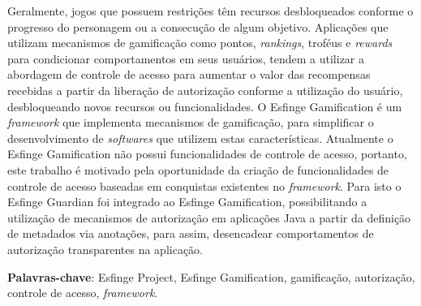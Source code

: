\setlength{\absparsep}{18pt} %
\begin{resumo}

     Geralmente, jogos que possuem restrições têm recursos desbloqueados conforme o progresso do personagem ou a consecução de algum objetivo. Aplicações que utilizam mecanismos de gamificação como pontos, \textit{rankings}, troféus e \textit{rewards} para condicionar comportamentos em seus usuários, tendem a utilizar a abordagem de controle de acesso para aumentar o valor das recompensas recebidas a partir da liberação de autorização conforme a utilização do usuário, desbloqueando novos recursos ou funcionalidades. O Esfinge Gamification é um \textit{framework} que implementa mecanismos de gamificação, para simplificar o desenvolvimento de \textit{softwares} que utilizem estas características. Atualmente o Esfinge Gamification não possui funcionalidades de controle de acesso, portanto, este trabalho é motivado pela oportunidade da criação de funcionalidades de controle de acesso baseadas em conquistas existentes no \textit{framework}. Para isto o Esfinge Guardian foi integrado ao Esfinge Gamification, possibilitando a utilização de mecanismos de autorização em aplicações Java a partir da definição de metadados via anotações, para assim, desencadear comportamentos de autorização transparentes na aplicação.
     
    \vspace{\onelineskip}
    \noindent
    \textbf{Palavras-chave}: Esfinge Project, Esfinge Gamification, gamificação, autorização, controle de acesso, \textit{framework}.
\end{resumo}

